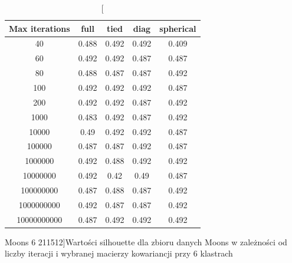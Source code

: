 \documentclass{classrep}
\begin{document}
{{\begin{table}[]
                \begin{minipage}{1\textwidth}
                \centering
                \begin{tabular}{|c|c|c|c|c|}
                \hline
                Max iterations & full & tied & diag & spherical \\ \hline
                40 & 0.488 & 0.492 & 0.492 & 0.409 \\ \hline
                60 & 0.492 & 0.492 & 0.487 & 0.487 \\ \hline
                80 & 0.488 & 0.487 & 0.487 & 0.492 \\ \hline
                100 & 0.492 & 0.492 & 0.492 & 0.487 \\ \hline
                200 & 0.492 & 0.492 & 0.487 & 0.492 \\ \hline
                1000 & 0.483 & 0.492 & 0.487 & 0.492 \\ \hline
                10000 & 0.49 & 0.492 & 0.492 & 0.487 \\ \hline
                100000 & 0.487 & 0.487 & 0.492 & 0.487 \\ \hline
                1000000 & 0.492 & 0.488 & 0.492 & 0.492 \\ \hline
                10000000 & 0.492 & 0.42 & 0.49 & 0.487 \\ \hline
                100000000 & 0.487 & 0.488 & 0.487 & 0.492 \\ \hline
                1000000000 & 0.492 & 0.487 & 0.487 & 0.492 \\ \hline
                10000000000 & 0.487 & 0.492 & 0.492 & 0.492 \\ \hline
                \end{tabular}
                \caption
                [Moons 6 211512]{Wartości silhouette dla zbioru danych Moons w zależności od liczby iteracji i wybranej macierzy kowariancji przy 6 klastrach}
                \label{Moons_6_211512}
                \end{minipage}
                \hfill
                

\end{table}}}
\end{document}
